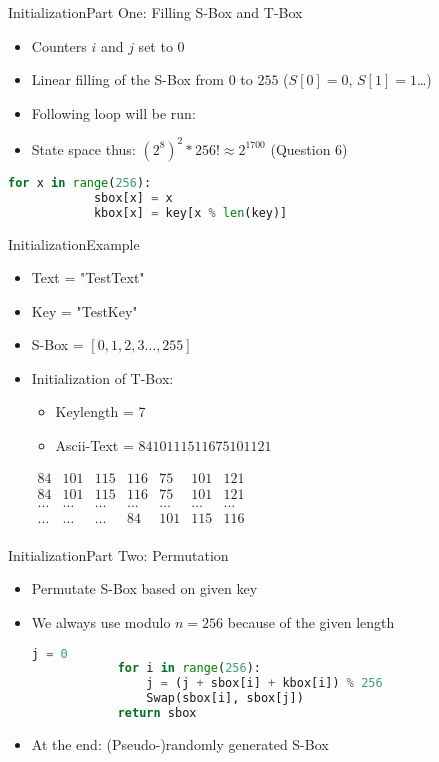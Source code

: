 \documentclass[
	aspectratio=169,	%
	onlytextwidth,		%
	t,					%
	]{beamer}
\begin{document}
\begin{frame}[fragile]{Initialization}{Part One: Filling S-Box and T-Box}
	\begin{itemize}
		\item Counters $i$ and $j$ set to $0$
		\item Linear filling of the S-Box from $0$ to $255$ ($S[0] = 0$, $S[1] = 1$\dots)
		\item Following loop will be run:
		\item State space thus: $(2^{8})^2 * 256! \approx 2^{1700}$ (Question 6)
	\end{itemize}
	\begin{lstlisting}[language=Python]
		for x in range(256):
			sbox[x] = x
			kbox[x] = key[x % len(key)]
	\end{lstlisting}
\end{frame}


\begin{frame}{Initialization}{Example}
	\begin{itemize}
		\item Text = "TestText"
		\item Key = "TestKey"
		\item S-Box = $[0, 1, 2, 3 \dots, 255]$
		\item Initialization of T-Box:
		\begin{itemize}
			\item Keylength = 7
			\item Ascii-Text = $84 101 115 116 75 101 121$
		\end{itemize}
		\medskip
		$\begin{array}{|ccccccc|}
		84 & 101 & 115 & 116 & 75 & 101 & 121 \\
		84 & 101 & 115 & 116 & 75 & 101 & 121 \\
		\dots & \dots & \dots & \dots & \dots & \dots & \dots \\
		\dots & \dots & \dots & 84 & 101 & 115 & 116 \\
		\end{array}$
	\end{itemize}
\end{frame}


\begin{frame}[fragile]{Initialization}{Part Two: Permutation}
	\begin{itemize}
		\item Permutate S-Box based on given key
		\item We always use modulo $n = 256$ because of the given length
		\begin{lstlisting}[language=Python]
			j = 0
			for i in range(256):
				j = (j + sbox[i] + kbox[i]) % 256
				Swap(sbox[i], sbox[j])
			return sbox
		\end{lstlisting}
		\item At the end: (Pseudo-)randomly generated S-Box
		
	\end{itemize}
\end{frame}
\end{document}
